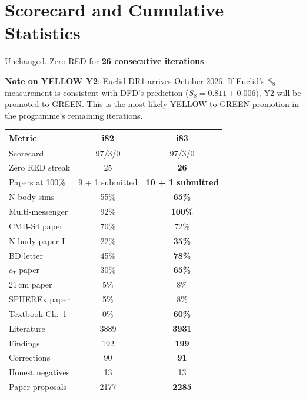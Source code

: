 \documentclass[11pt,a4paper]{article}
\begin{document}
\section{Scorecard and Cumulative Statistics}

\begin{tcolorbox}[colback=green!5!white, colframe=dfdgreen, title=\textbf{Scorecard: 97 GREEN / 3 YELLOW / 0 RED}]
Unchanged. Zero RED for \textbf{26 consecutive iterations}.

\textbf{Note on YELLOW Y2}: Euclid DR1 arrives October 2026. If Euclid's $S_8$ measurement is consistent with DFD's prediction ($S_8 = 0.811 \pm 0.006$), Y2 will be promoted to GREEN. This is the most likely YELLOW-to-GREEN promotion in the programme's remaining iterations.
\end{tcolorbox}

\begin{center}
\begin{tabular}{lcc}
\toprule
\textbf{Metric} & \textbf{i82} & \textbf{i83} \\
\midrule
Scorecard & 97/3/0 & 97/3/0 \\
Zero RED streak & 25 & \textbf{26} \\
Papers at 100\% & 9 + 1 submitted & \textbf{10 + 1 submitted} \\
N-body sims & 55\% & \textbf{65\%} \\
Multi-messenger & 92\% & \textbf{100\%} \\
CMB-S4 paper & 70\% & 72\% \\
N-body paper I & 22\% & \textbf{35\%} \\
BD letter & 45\% & \textbf{78\%} \\
$c_T$ paper & 30\% & \textbf{65\%} \\
21\,cm paper & 5\% & 8\% \\
SPHEREx paper & 5\% & 8\% \\
Textbook Ch.\ 1 & 0\% & \textbf{60\%} \\
Literature & 3889 & \textbf{3931} \\
Findings & 192 & \textbf{199} \\
Corrections & 90 & \textbf{91} \\
Honest negatives & 13 & 13 \\
Paper proposals & 2177 & \textbf{2285} \\
\bottomrule
\end{tabular}
\end{center}
\end{document}
